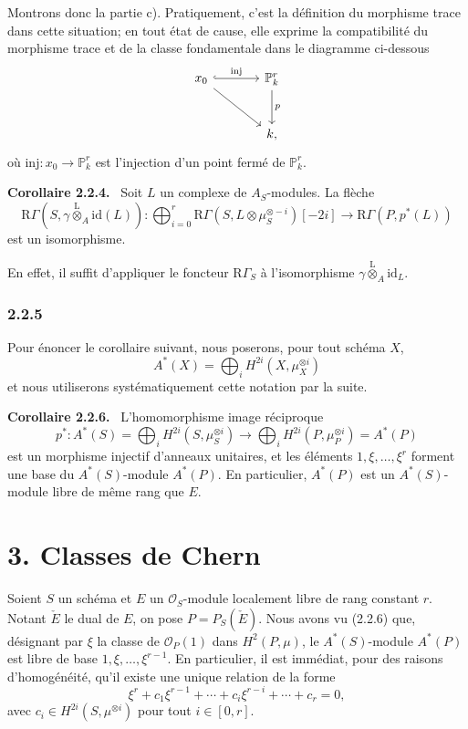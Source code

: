 \documentclass[11pt]{article}
\newenvironment{statement}[1]{\par\medskip\noindent\textbf{#1.}\ }{\par\medskip}
\newcommand{\R}{\mathrm{R}}\newcommand{\RHomCore}{\mathrm{RHom}}
\providecommand{\lten}{\overset{\mathrm L}{\otimes}}
\providecommand{\lten}{\overset{\mathrm L}{\otimes}}
\providecommand{\lten}{\overset{\mathrm L}{\otimes}}
\providecommand{\R}{\mathrm R}
\providecommand{\lten}{\overset{\mathrm L}{\otimes}}
\providecommand{\lten}{\overset{\mathrm L}{\otimes}}
\providecommand{\lten}{\overset{\mathrm L}{\otimes}}
\providecommand{\lten}{\overset{\mathrm L}{\otimes}}
\begin{document}
Montrons donc la partie c). Pratiquement, c'est la définition du morphisme trace dans cette situation; en tout état de cause, elle exprime la compatibilité du morphisme trace et de la classe fondamentale dans le diagramme ci-dessous
\[
\begin{tikzcd}[column sep=large,row sep=large]
x_0 \arrow[r,hook,"\mathrm{inj}"] \arrow[dr] & \mathbb P^r_k \arrow[d,"p"]\\
& k ,
\end{tikzcd}
\]
où $\mathrm{inj}:x_0\to \mathbb P^r_k$ est l'injection d'un point fermé de $\mathbb P^r_k$.

\begin{statement}{Corollaire 2.2.4}
Soit $L$ un complexe de $A_S$-modules. La flèche
\[
\R\Gamma(S,\gamma\lten_A\mathrm{id}(L)):
\bigoplus_{i=0}^r \R\Gamma(S,L\otimes\mu_S^{\otimes -i})[-2i]
\longrightarrow
\R\Gamma(P,p^*(L))
\]
est un isomorphisme.
\end{statement}

En effet, il suffit d'appliquer le foncteur $\R\Gamma_S$ à l'isomorphisme $\gamma\lten_A\mathrm{id}_L$.

\subsubsection*{2.2.5}
Pour énoncer le corollaire suivant, nous poserons, pour tout schéma $X$,
\[
A^*(X)=\bigoplus_i H^{2i}(X,\mu_X^{\otimes i})
\]
et nous utiliserons systématiquement cette notation par la suite.

\begin{statement}{Corollaire 2.2.6}
L'homomorphisme image réciproque
\[
p^*:A^*(S)=\bigoplus_i H^{2i}(S,\mu_S^{\otimes i})
\longrightarrow
\bigoplus_i H^{2i}(P,\mu_P^{\otimes i})=A^*(P)
\]
est un morphisme injectif d'anneaux unitaires, et les éléments $1,\xi,\ldots,\xi^r$ forment une base du $A^*(S)$-module $A^*(P)$. En particulier, $A^*(P)$ est un $A^*(S)$-module libre de même rang que $E$.
\end{statement}

\section*{3. Classes de Chern}

Soient $S$ un schéma et $E$ un $\mathcal O_S$-module localement libre de rang constant $r$. Notant $\check E$ le dual de $E$, on pose $P=P_S(\check E)$. Nous avons vu (2.2.6) que, désignant par $\xi$ la classe de $\mathcal O_P(1)$ dans $H^2(P,\mu)$, le $A^*(S)$-module $A^*(P)$ est libre de base $1,\xi,\ldots,\xi^{r-1}$. En particulier, il est immédiat, pour des raisons d'homogénéité, qu'il existe une unique relation de la forme
\[
\xi^r+c_1\xi^{r-1}+\cdots+c_i\xi^{r-i}+\cdots+c_r=0,
\tag{3.1}
\]
avec $c_i\in H^{2i}(S,\mu^{\otimes i})$ pour tout $i\in[0,r]$.
\end{document}
